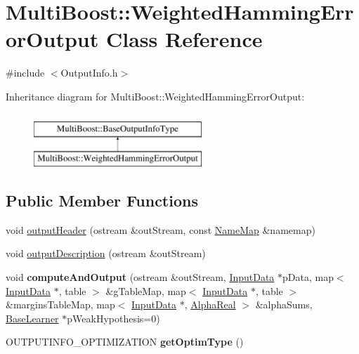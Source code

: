 \hypertarget{classMultiBoost_1_1WeightedHammingErrorOutput}{\section{Multi\-Boost\-:\-:Weighted\-Hamming\-Error\-Output Class Reference}
\label{classMultiBoost_1_1WeightedHammingErrorOutput}
}


{\ttfamily \#include $<$Output\-Info.\-h$>$}

Inheritance diagram for Multi\-Boost\-:\-:Weighted\-Hamming\-Error\-Output\-:\begin{figure}[H]
\begin{center}
\leavevmode
\includegraphics[height=2.000000cm]{classMultiBoost_1_1WeightedHammingErrorOutput}
\end{center}
\end{figure}
\subsection*{Public Member Functions}
\begin{DoxyCompactItemize}
\item 
void \hyperlink{classMultiBoost_1_1WeightedHammingErrorOutput_a0d0b87220af1d5db7a4422181eac7073}{output\-Header} (ostream \&out\-Stream, const \hyperlink{classMultiBoost_1_1NameMap}{Name\-Map} \&namemap)
\item 
void \hyperlink{classMultiBoost_1_1WeightedHammingErrorOutput_ac90950e8768eb62a53ecc01c586ce640}{output\-Description} (ostream \&out\-Stream)
\item 
\hypertarget{classMultiBoost_1_1WeightedHammingErrorOutput_aeab8e41184941f6d7ae0166fc5b1e13b}{void {\bfseries compute\-And\-Output} (ostream \&out\-Stream, \hyperlink{classMultiBoost_1_1InputData}{Input\-Data} $\ast$p\-Data, map$<$ \hyperlink{classMultiBoost_1_1InputData}{Input\-Data} $\ast$, table $>$ \&g\-Table\-Map, map$<$ \hyperlink{classMultiBoost_1_1InputData}{Input\-Data} $\ast$, table $>$ \&margins\-Table\-Map, map$<$ \hyperlink{classMultiBoost_1_1InputData}{Input\-Data} $\ast$, \hyperlink{Defaults_8h_a80184c4fd10ab70a1a17c5f97dcd1563}{Alpha\-Real} $>$ \&alpha\-Sums, \hyperlink{classMultiBoost_1_1BaseLearner}{Base\-Learner} $\ast$p\-Weak\-Hypothesis=0)}\label{classMultiBoost_1_1WeightedHammingErrorOutput_aeab8e41184941f6d7ae0166fc5b1e13b}

\item 
\hypertarget{classMultiBoost_1_1WeightedHammingErrorOutput_abb2f4e76893c2300dff02843802b8d57}{O\-U\-T\-P\-U\-T\-I\-N\-F\-O\-\_\-\-O\-P\-T\-I\-M\-I\-Z\-A\-T\-I\-O\-N {\bfseries get\-Optim\-Type} ()}\label{classMultiBoost_1_1WeightedHammingErrorOutput_abb2f4e76893c2300dff02843802b8d57}

\end{DoxyCompactItemize}
